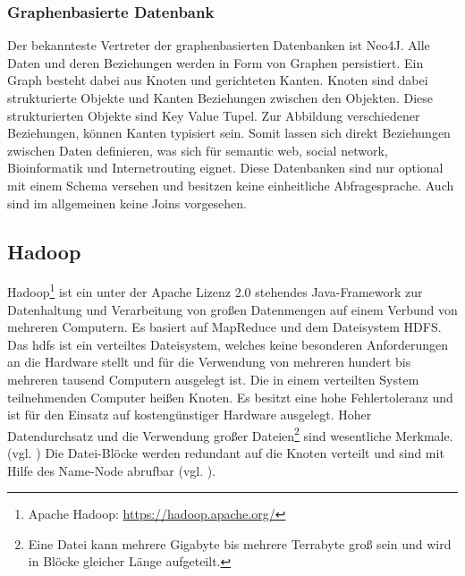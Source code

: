 \subsubsection{Graphenbasierte Datenbank}

Der bekannteste Vertreter der graphenbasierten Datenbanken ist Neo4J.
Alle Daten und deren Beziehungen werden in Form von Graphen persistiert.
Ein Graph besteht dabei aus Knoten und gerichteten Kanten.
Knoten sind dabei strukturierte Objekte und Kanten Beziehungen zwischen den Objekten.
Diese strukturierten Objekte sind Key Value Tupel.
Zur Abbildung verschiedener Beziehungen, können Kanten typisiert sein.
Somit lassen sich direkt Beziehungen zwischen Daten definieren, was sich für semantic web, social network, Bioinformatik und Internetrouting eignet.
Diese Datenbanken sind nur optional mit einem Schema versehen und besitzen keine einheitliche Abfragesprache.
Auch sind im allgemeinen keine Joins vorgesehen.


\subsection{Hadoop}
\label{hadoop}
Hadoop\footnote{Apache Hadoop: \url{https://hadoop.apache.org/}} ist ein unter der Apache Lizenz 2.0 stehendes Java-Framework zur Datenhaltung und Verarbeitung von großen Datenmengen auf einem Verbund von mehreren Computern.
Es basiert auf MapReduce und dem Dateisystem HDFS.\\
Das \Gls{hdfs} ist ein verteiltes Dateisystem, welches keine besonderen Anforderungen an die Hardware stellt und für die Verwendung von mehreren hundert bis mehreren tausend Computern ausgelegt ist.
Die in einem verteilten System teilnehmenden Computer heißen Knoten.
Es besitzt eine hohe Fehlertoleranz und ist für den Einsatz auf kostengünstiger Hardware ausgelegt.
Hoher Datendurchsatz und die Verwendung großer Dateien\footnote{Eine Datei kann mehrere Gigabyte bis mehrere Terrabyte groß sein und wird in Blöcke gleicher Länge aufgeteilt.} sind wesentliche Merkmale. (vgl. \cite[S.3]{paper:hadoop})
Die Datei-Blöcke werden redundant auf die Knoten verteilt und sind mit Hilfe des Name-Node abrufbar (vgl. \cite[S.7]{ba:dan}).

